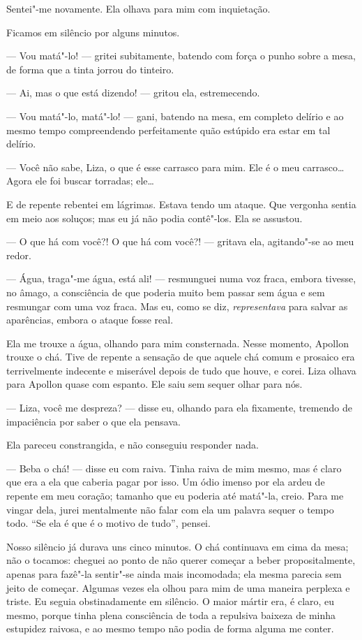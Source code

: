 Sentei"-me novamente. Ela olhava para mim com inquietação.

Ficamos em silêncio por alguns minutos.

--- Vou matá"-lo! --- gritei subitamente, batendo com força o punho sobre a
mesa, de forma que a tinta jorrou do tinteiro.

--- Ai, mas o que está dizendo! --- gritou ela, estremecendo.

--- Vou matá"-lo, matá"-lo! --- gani, batendo na mesa, em completo delírio e
ao mesmo tempo compreendendo perfeitamente quão estúpido era estar em
tal delírio.

--- Você não sabe, Liza, o que é esse carrasco para mim. Ele é o meu
carrasco\ldots{} Agora ele foi buscar torradas; ele\ldots{}

E de repente rebentei em lágrimas. Estava tendo um ataque. Que vergonha
sentia em meio aos soluços; mas eu já não podia contê"-los. Ela se
assustou.

--- O que há com você?! O que há com você?! --- gritava ela, agitando"-se ao
meu redor.

--- Água, traga"-me água, está ali! --- resmunguei numa voz fraca, embora
tivesse, no âmago, a consciência de que poderia muito bem passar sem 
água e sem resmungar com uma voz fraca. Mas eu, como se diz,
\textit{representava} para salvar as aparências, embora o ataque fosse
real.

Ela me trouxe a água, olhando para mim consternada. Nesse momento,
Apollon trouxe o chá. Tive de repente a sensação de que aquele chá
comum e prosaico era terrivelmente indecente e miserável depois de tudo
que houve, e corei. Liza olhava para Apollon quase com espanto. Ele
saiu sem sequer olhar para nós.

--- Liza, você me despreza? --- disse eu, olhando para ela fixamente,
tremendo de impaciência por saber o que ela pensava.

Ela pareceu constrangida, e não conseguiu responder nada.

--- Beba o chá! --- disse eu com raiva. Tinha raiva de mim mesmo, mas é
claro que era a ela que caberia pagar por isso. Um ódio imenso por ela
ardeu de repente em meu coração; tamanho que eu poderia até matá"-la,
creio. Para me vingar dela, jurei mentalmente não falar com ela um
palavra sequer o tempo todo. ``Se ela é que é o motivo de tudo'', pensei.

Nosso silêncio já durava uns cinco minutos. O chá continuava em cima da
mesa; não o tocamos: cheguei ao ponto de não querer começar a beber
propositalmente, apenas para fazê"-la sentir"-se ainda mais incomodada; ela
mesma parecia sem jeito de começar. Algumas vezes ela olhou para mim de
uma maneira perplexa e triste. Eu seguia obstinadamente em silêncio. O
maior mártir era, é claro, eu mesmo, porque tinha plena consciência de
toda a repulsiva baixeza de minha estupidez raivosa, e ao mesmo tempo
não podia de forma alguma me conter.

